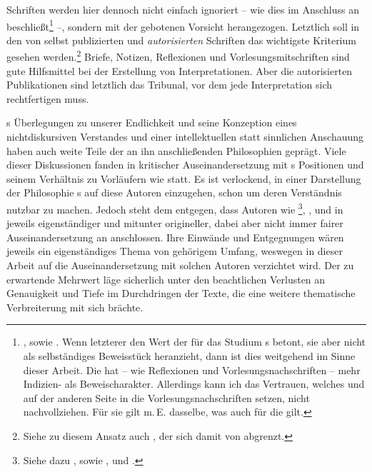 Schriften werden hier dennoch nicht einfach ignoriert -- wie dies
 im Anschluss an
beschließt\footnote{\cite[Vgl.][1]{Stuhlmann-Laeisz:KantsLogik1976}, sowie
\cite[][\pno~24, Anm.
11]{Reich:DieVollstaendigkeitderkantischenUrteilstafel1932}. Wenn letzterer den
Wert der {\jaeschelogik} für das Studium s betont, sie
aber nicht als selbständiges Beweisstück heranzieht, dann ist dies weitgehend
im Sinne dieser Arbeit. Die {\jaeschelogik} hat -- wie Reflexionen und
Vorlesungsnachschriften -- mehr Indizien- als Beweischarakter. Allerdings kann ich
das Vertrauen, welches
 und
 auf der anderen Seite in die Vorlesungsnachschriften
setzen, nicht nachvollziehen. Für sie gilt m.\,E. dasselbe, was auch für die
{\jaeschelogik} gilt.} --, sondern mit der gebotenen Vorsicht herangezogen.
Letztlich soll in den von  selbst
publizierten und \emph{autorisierten} Schriften das wichtigste Kriterium gesehen
werden.\footnote{Siehe zu diesem Ansatz auch
\textcite[][21--23]{Schwaiger:KategorischeundandereImperative1999}, der sich
damit von \textcite[vgl.][6--8]{Schmitz:WaswollteKant1989} abgrenzt.} Briefe,
Notizen, Reflexionen und Vorlesungsmitschriften sind gute Hilfsmittel bei der
Erstellung von Interpretationen. Aber die autorisierten Publikationen sind
letztlich das Tribunal, vor dem jede Interpretation sich rechtfertigen muss.

\label{Einleitung:AbschnittIdealistennachKant}
s Überlegungen zu unserer Endlichkeit und seine Konzeption
eines nicht\-dis\-kur\-si\-ven Verstandes und einer intellektuellen statt
sinnlichen Anschauung haben auch weite Teile der an ihn anschließenden Philosophien
geprägt. Viele dieser Diskussionen fanden in kritischer Auseinandersetzung mit
s Positionen und seinem Verhältnis zu Vorläufern wie
 statt. Es
ist verlockend, in einer Darstellung der Philosophie
s auf diese Autoren einzugehen, schon um deren Verständnis
nutzbar zu machen. Jedoch steht dem entgegen, dass Autoren wie
\footnote{Siehe dazu
\cite{Atlas:SolomonMaimonsDoctrineofInfiniteReasonanditsHistoricalRelations1952},
sowie \cite[][326--361]{Kroner:VonKantbisHegel2007}, und
\cite{Ehrensperger:WeltseeleundunendlicherVerstand2006}.},
,
 und
 in jeweils eigenständiger und mitunter
origineller, dabei aber nicht immer fairer Auseinandersetzung an
 anschlossen. Ihre Einwände und Entgegnungen wären jeweils
ein eigenständiges Thema von gehörigem Umfang, weswegen in dieser Arbeit auf die
Auseinandersetzung mit solchen Autoren verzichtet wird. Der zu erwartende
Mehrwert läge sicherlich unter den beachtlichen Verlusten an Genauigkeit und
Tiefe im Durchdringen der Texte, die eine weitere thematische Verbreiterung mit
sich brächte.

